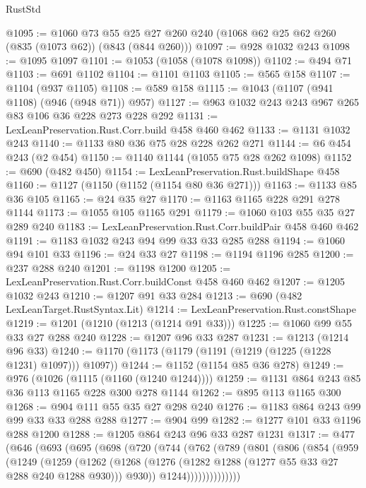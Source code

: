 \begin{lexlean}{RustStd}
\begin{coremodule}
@1095 := @1060
    @73
    @55
    @25
    @27
    @260
    @240
    (@1068 @62 @25 @62 @260 (@835 (@1073 @62)) (@843 (@844 @260)))
@1097 := @928 @1032 @243
@1098 := @1095 @1097
@1101 := @1053 (@1058 (@1078 @1098))
@1102 := @494 @71
@1103 := @691 @1102
@1104 := @1101 @1103
@1105 := @565 @158
@1107 := @1104 (@937 @1105)
@1108 := @589 @158
@1115 := @1043 (@1107 (@941 @1108) (@946 (@948 @71)) @957)
@1127 := @963 @1032 @243 @243 @967 @265 @83 @106 @36 @228 @273 @228 @292
@1131 := LexLeanPreservation.Rust.Corr.build @458 @460 @462
@1133 := @1131 @1032 @243
@1140 := @1133 @80 @36 @75 @28 @228 @262 @271
@1144 := @6 @454 @243 (@2 @454)
@1150 := @1140 @1144 (@1055 @75 @28 @262 @1098)
@1152 := @690 (@482 @450)
@1154 := LexLeanPreservation.Rust.buildShape @458
@1160 := @1127 (@1150 (@1152 (@1154 @80 @36 @271)))
@1163 := @1133 @85 @36 @105
@1165 := @24 @35 @27
@1170 := @1163 @1165 @228 @291 @278 @1144
@1173 := @1055 @105 @1165 @291
@1179 := @1060 @103 @55 @35 @27 @289 @240
@1183 := LexLeanPreservation.Rust.Corr.buildPair @458 @460 @462
@1191 := @1183 @1032 @243 @94 @99 @33 @33 @285 @288
@1194 := @1060 @94 @101 @33
@1196 := @24 @33 @27
@1198 := @1194 @1196 @285
@1200 := @237 @288 @240
@1201 := @1198 @1200
@1205 := LexLeanPreservation.Rust.Corr.buildConst @458 @460 @462
@1207 := @1205 @1032 @243
@1210 := @1207 @91 @33 @284
@1213 := @690 (@482 LexLeanTarget.RustSyntax.Lit)
@1214 := LexLeanPreservation.Rust.constShape
@1219 := @1201 (@1210 (@1213 (@1214 @91 @33)))
@1225 := @1060 @99 @55 @33 @27 @288 @240
@1228 := @1207 @96 @33 @287
@1231 := @1213 (@1214 @96 @33)
@1240 := @1170 (@1173 (@1179 (@1191 (@1219 (@1225 (@1228 @1231) @1097))) @1097))
@1244 := @1152 (@1154 @85 @36 @278)
@1249 := @976 (@1026 (@1115 (@1160 (@1240 @1244))))
@1259 := @1131 @864 @243 @85 @36 @113 @1165 @228 @300 @278 @1144
@1262 := @895 @113 @1165 @300
@1268 := @904 @111 @55 @35 @27 @298 @240
@1276 := @1183 @864 @243 @99 @99 @33 @33 @288 @288
@1277 := @904 @99
@1282 := @1277 @101 @33 @1196 @288 @1200
@1288 := @1205 @864 @243 @96 @33 @287 @1231
@1317 := @477
    (@646
      (@693
        (@695
          (@698
            (@720
              (@744
                (@762
                  (@789
                    (@801
                      (@806
                        (@854
                          (@959
                            (@1249
                              (@1259
                                (@1262
                                  (@1268
                                    (@1276 (@1282 @1288 (@1277 @55 @33 @27 @288 @240 @1288 @930)))
                                    @930))
                                @1244))))))))))))))

\end{coremodule}
\end{lexlean}
